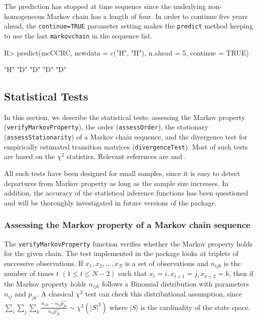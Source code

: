 \documentclass[
  nojss]{jss}
\begin{document}
The prediction has stopped at time sequence since the underlying non-homogeneous Markov chain has a length of four. In order to continue five years ahead, the \texttt{continue=TRUE} parameter setting makes the \texttt{predict} method keeping to use the last \texttt{markovchain} in the sequence list.

\begin{CodeChunk}

\begin{CodeInput}
R> predict(mcCCRC, newdata = c("H", "H"), n.ahead = 5, continue = TRUE)
\end{CodeInput}

\begin{CodeOutput}
[1] "H" "D" "D" "D" "D"
\end{CodeOutput}
\end{CodeChunk}

\hypertarget{statistical-tests}{%
\subsection{Statistical Tests}\label{statistical-tests}}

In this section, we describe the statistical tests: assessing the Markov property (\texttt{verifyMarkovProperty}), the order (\texttt{assessOrder}), the stationary (\texttt{assessStationarity}) of a Markov chain sequence, and the divergence test for empirically estimated transition matrices (\texttt{divergenceTest}). Most of such tests are based on the \(\chi ^2\) statistics. Relevant references are \cite{kullback1962tests} and \cite{anderson1957statistical}.

All such tests have been designed for small samples, since it is easy to detect departures from Markov property as long as the sample size increases. In addition, the accuracy of the statistical inference functions has been questioned and will be thoroughly investigated in future versions of the package.

\hypertarget{assessing-the-markov-property-of-a-markov-chain-sequence}{%
\subsubsection{Assessing the Markov property of a Markov chain sequence}\label{assessing-the-markov-property-of-a-markov-chain-sequence}}

The \texttt{verifyMarkovProperty} function verifies whether the Markov property holds for the given chain. The test implemented in the package looks at triplets of successive observations. If \(x_1, x_2, \ldots, x_N\) is a set of observations and \(n_{ijk}\) is the number of times \(t\) \(\left(1 \le t \le N-2 \right)\) such that \(x_t=i, x_{t+1}=j, x_{x+2}=k\), then if the Markov property holds \(n_{ijk}\) follows a Binomial distribution with parameters \(n_{ij}\) and \(p_{jk}\). A classical \(\chi^2\) test can check this distributional assumption, since \(\sum_{i}\sum_{j}\sum_{k}\frac{n_{ijk}-n_{ij}\hat{p_{jk}}}{n_{ij}\hat{p_{jk}}}\sim \chi^2\left(|S|^3 \right )\) where \(|S|\) is the cardinality of the state space.
\end{document}
